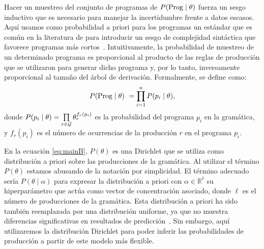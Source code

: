 Hacer un muestreo del conjunto de programas de $P(\Prog \mid \theta)$ fuerza un sesgo inductivo que es necesario para manejar la incertidumbre frente a datos escasos. Aquí usamos como probabilidad a priori para los programas un estándar que es común en la literatura de \lot para introducir un sesgo de complejidad sintáctica que favorece programas más cortos~\cite{goodman2008rational,overlan2017learning}. Intuitivamente, la probabilidad de muestreo de un determinado programa es proporcional al producto de las reglas de producción que se utilizaron para generar dicho programa y, por lo tanto, inversamente proporcional al tamaño del árbol de derivación. Formalmente, se define como:
%
\begin{equation*}
\label{eqC}
P(\Prog \mid \theta)\ = \prod\limits_{i = 1}^n P(p_i \mid \theta),
\end{equation*}
%
donde $P(p_i \mid \theta) = \prod\limits_{r \in \gram} \theta^{f_r(p_i)}_{r}$ es la probabilidad del programa $p_i$ en la gramática, y $f_r(p_i)$ es el número de ocurrencias de la producción $r$ en el programa $p_i$.


En la ecuación \eqref{eq:mainB}, $P(\theta)$ es una Dirichlet que se utiliza como distribución a priori sobre las producciones de la gramática. Al utilizar el término $P(\theta)$ estamos abusando de la notación por simplicidad. El término adecuado sería $P(\theta \mid \alpha)$ para expresar la distribución a priori con $\alpha \in \mathbb{R}^\ell$ su hiperparámetro que actúa como vector de concentración asociado, donde $\ell$ es el número de producciones de la gramática. Esta distribución a priori ha sido también reemplazada por una distribución uniforme, ya que no muestra diferencias significativas en resultados de predicción~\cite{piantadosi2012bootstrapping,yildirim2015learning}. Sin embargo, aquí utilizaremos la distribución Dirichlet para poder inferir las probabilidades de producción a partir de este modelo más flexible.

